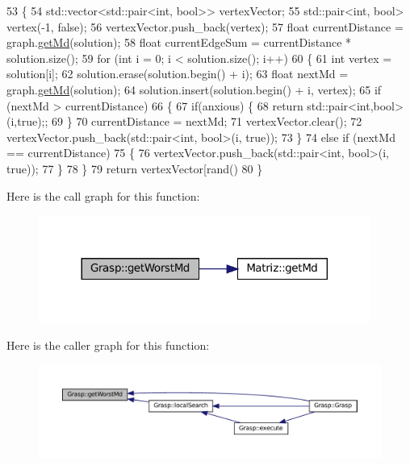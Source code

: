 \begin{DoxyCode}
53                                                            \{
54   std::vector<std::pair<int, bool>> vertexVector;
55   std::pair<int, bool> vertex(-1, \textcolor{keyword}{false});
56   vertexVector.push\_back(vertex);
57   \textcolor{keywordtype}{float} currentDistance = graph.\hyperlink{classMatriz_a8df14a27d791f24206dd633b2a685c5b}{getMd}(solution);
58   \textcolor{keywordtype}{float} currentEdgeSum = currentDistance * solution.size();
59   \textcolor{keywordflow}{for} (\textcolor{keywordtype}{int} i = 0; i < solution.size(); i++)
60   \{
61     \textcolor{keywordtype}{int} vertex = solution[i];
62     solution.erase(solution.begin() + i);
63     \textcolor{keywordtype}{float} nextMd = graph.\hyperlink{classMatriz_a8df14a27d791f24206dd633b2a685c5b}{getMd}(solution);
64     solution.insert(solution.begin() + i, vertex);
65     \textcolor{keywordflow}{if} (nextMd > currentDistance)
66     \{
67       \textcolor{keywordflow}{if}(anxious) \{
68         \textcolor{keywordflow}{return} std::pair<int,bool>(i,\textcolor{keyword}{true});;
69       \}
70       currentDistance = nextMd;
71       vertexVector.clear();
72       vertexVector.push\_back(std::pair<int, bool>(i, \textcolor{keyword}{true}));
73     \}
74     \textcolor{keywordflow}{else} \textcolor{keywordflow}{if} (nextMd == currentDistance)
75     \{
76       vertexVector.push\_back(std::pair<int, bool>(i, \textcolor{keyword}{true}));
77     \}
78   \}
79   \textcolor{keywordflow}{return} vertexVector[rand() %
80 \}
\end{DoxyCode}
Here is the call graph for this function\+:\nopagebreak
\begin{figure}[H]
\begin{center}
\leavevmode
\includegraphics[width=308pt]{classGrasp_a858a5aee4066bf5ef7946e8ea3e10bcf_cgraph}
\end{center}
\end{figure}
Here is the caller graph for this function\+:\nopagebreak
\begin{figure}[H]
\begin{center}
\leavevmode
\includegraphics[width=350pt]{classGrasp_a858a5aee4066bf5ef7946e8ea3e10bcf_icgraph}
\end{center}
\end{figure}
\mbox{\label{classGrasp_a7c5bebb4a0dea342928f66fb73a56559}} 
